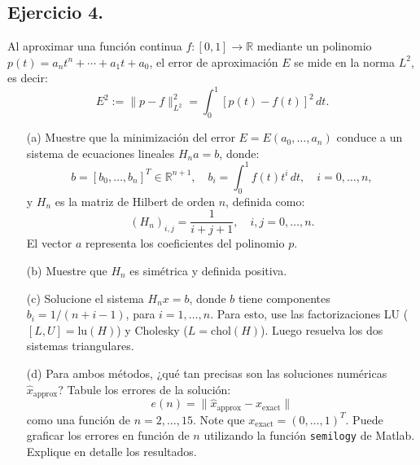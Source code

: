 
\subsection*{Ejercicio 4.}
Al aproximar una función continua $f : [0, 1] \to \mathbb{R}$ mediante un polinomio $p(t) = a_n t^n + \cdots + a_1 t + a_0$, el error de aproximación $E$ se mide en la norma $L^2$, es decir:
\[
E^2 := \|p - f\|_{L^2}^2 = \int_0^1 [p(t) - f(t)]^2 \, dt.
\]

\begin{enumerate}
    \item[(a)] Muestre que la minimización del error $E = E(a_0, \ldots, a_n)$ conduce a un sistema de ecuaciones lineales $H_n a = b$, donde:
    \[
    b = [b_0, \ldots, b_n]^T \in \mathbb{R}^{n+1}, \quad b_i = \int_0^1 f(t)t^i \, dt, \quad i = 0, \ldots, n,
    \]
    y $H_n$ es la matriz de Hilbert de orden $n$, definida como:
    \[
    (H_n)_{i,j} = \frac{1}{i + j + 1}, \quad i, j = 0, \ldots, n.
    \]
    El vector $a$ representa los coeficientes del polinomio $p$.
    \item[(b)] Muestre que $H_n$ es simétrica y definida positiva.
    \item[(c)] Solucione el sistema $H_n x = b$, donde $b$ tiene componentes $b_i = 1 / (n + i - 1)$, para $i = 1, \ldots, n$. Para esto, use las factorizaciones LU ($[L, U] = \text{lu}(H)$) y Cholesky ($L = \text{chol}(H)$). Luego resuelva los dos sistemas triangulares.
    \item[(d)] Para ambos métodos, ¿qué tan precisas son las soluciones numéricas $\hat{x}_{\text{approx}}$? Tabule los errores de la solución:
    \[
    e(n) = \|\hat{x}_{\text{approx}} - x_{\text{exact}}\|
    \]
    como una función de $n = 2, \ldots, 15$. Note que $x_{\text{exact}} = (0, \ldots, 1)^T$. Puede graficar los errores en función de $n$ utilizando la función \texttt{semilogy} de Matlab. Explique en detalle los resultados.
\end{enumerate}

